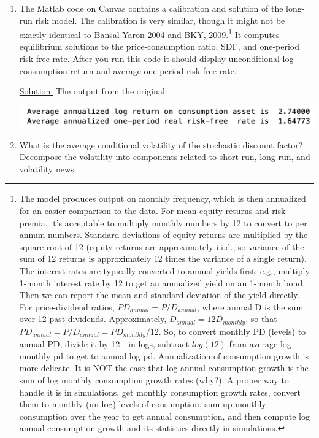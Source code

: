 \documentclass{article}
\begin{document}
\begin{enumerate}

\item The Matlab code on Canvas contains a calibration and solution of the long-run risk model. The calibration is very similar, though it might not be exactly identical to Bansal Yaron 2004 and BKY, 2009.\footnote{The model produces output on monthly frequency, which is then annualized for an easier comparison to the data. For mean equity returns and risk premia, it’s acceptable to multiply monthly numbers by 12 to convert to per annum numbers. Standard deviations of equity returns are multiplied by the square root of 12 (equity returns are approximately i.i.d., so variance of the sum of 12 returns is approximately 12 times the variance of a single return). The interest rates are typically converted to annual yields first: e.g., multiply 1-month interest rate by 12 to get an annualized yield on an 1-month bond. Then we can report the mean and standard deviation of the yield directly. For price-dividend ratios, $PD_{annual} = P/D_{annual}$, where annual D is the sum over 12 past dividends. Approximately, $D_{annual} = 12D_{monthly}$, so that $PD_{annual} = P/D_{annual} = PD_{monthly}/12$. So, to convert monthly PD (levels) to annual PD, divide it by 12 - in logs, subtract $log(12)$ from average log monthly pd to get to annual log pd. Annualization of consumption growth is more delicate. It is NOT the case that log annual consumption growth is the sum of log monthly consumption growth rates (why?). A proper way to handle it is in simulations, get monthly consumption growth rates, convert them to monthly (un-log) levels of consumption, sum up monthly consumption over the year to get annual consumption, and then compute log annual consumption growth and its statistics directly in simulations.} It computes equilibrium solutions to the price-consumption ratio, SDF, and one-period risk-free rate. After you run this code it should display unconditional log consumption return and average one-period risk-free rate.

\bigskip

\underline{Solution:}  The output from the original:

\includegraphics[scale = 0.75]{output_p4_q1}

\bigskip

\item  What is the average conditional volatility of the stochastic discount factor? Decompose the volatility into components related to short-run, long-run, and volatility news.


\end{enumerate}
\end{document}
